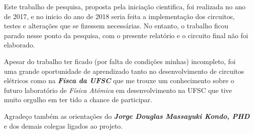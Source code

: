 Este trabalho de pesquisa, proposta pela iniciação cientifica, foi realizada no ano de 2017, e no inicio do ano de 2018 seria feita a implementação dos circuitos, testes e alterações que se fizessem necessárias. No entanto, o trabalho ficou parado nesse ponto da pesquisa, com o presente relatório e o circuito final não foi elaborado. 

Apesar do trabalho ter ficado (por falta de condições minhas) incompleto, foi uma grande oportunidade de aprendizado tanto no desenvolvimento de circuitos elétricos como na \textbf{\emph{Físca da UFSC}} que me trouxe um conhecimento sobre o futuro laboratório de \emph{Física Atómica} em desenvolvimento na UFSC que tive muito orgulho em ter tido a chance de participar. 

Agradeço também as orientações do \textbf{\emph{Jorge Douglas Massayuki Kondo, PHD}} e dos demais colegas ligados ao projeto. 

